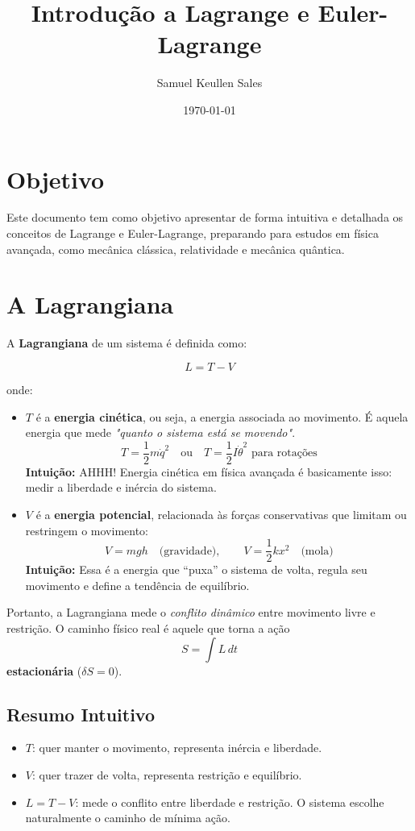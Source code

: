 \documentclass[12pt,a4paper]{article}
\title{Introdução a Lagrange e Euler-Lagrange}
\author{Samuel Keullen Sales}
\date{\today}
\begin{document}
\maketitle

\section{Objetivo}
Este documento tem como objetivo apresentar de forma intuitiva e detalhada os conceitos de Lagrange e Euler-Lagrange, preparando para estudos em física avançada, como mecânica clássica, relatividade e mecânica quântica.

\section{A Lagrangiana}

A \textbf{Lagrangiana} de um sistema é definida como:

\begin{equation}
L = T - V
\end{equation}

onde:

\begin{itemize}
    \item $T$ é a \textbf{energia cinética}, ou seja, a energia associada ao movimento. 
    É aquela energia que mede \textit{"quanto o sistema está se movendo"}.
    \[
    T = \frac{1}{2} m \dot{q}^2 \quad \text{ou} \quad T = \frac{1}{2} I \dot{\theta}^2 \text{ para rotações}
    \]
    \textbf{Intuição:} AHHH! Energia cinética em física avançada é basicamente isso: medir a liberdade e inércia do sistema.

    \item $V$ é a \textbf{energia potencial}, relacionada às forças conservativas que limitam ou restringem o movimento:
    \[
    V = m g h \quad \text{(gravidade)}, \qquad V = \frac{1}{2} k x^2 \quad \text{(mola)}
    \]
    \textbf{Intuição:} Essa é a energia que “puxa” o sistema de volta, regula seu movimento e define a tendência de equilíbrio.
\end{itemize}

Portanto, a Lagrangiana mede o \textit{conflito dinâmico} entre movimento livre e restrição. O caminho físico real é aquele que torna a ação
\begin{equation}
S = \int L \, dt
\end{equation}
\textbf{estacionária} (\(\delta S = 0\)).

\subsection{Resumo Intuitivo}
\begin{itemize}
    \item $T$: quer manter o movimento, representa inércia e liberdade.
    \item $V$: quer trazer de volta, representa restrição e equilíbrio.
    \item $L = T - V$: mede o conflito entre liberdade e restrição. O sistema escolhe naturalmente o caminho de mínima ação.
\end{itemize}
\end{document}
